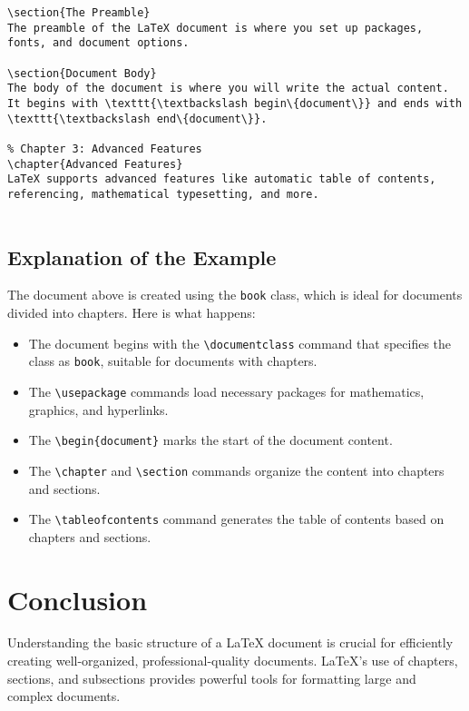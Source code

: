\begin{verbatim}
\section{The Preamble}
The preamble of the LaTeX document is where you set up packages, fonts, and document options.

\section{Document Body}
The body of the document is where you will write the actual content. It begins with \texttt{\textbackslash begin\{document\}} and ends with \texttt{\textbackslash end\{document\}}.

% Chapter 3: Advanced Features
\chapter{Advanced Features}
LaTeX supports advanced features like automatic table of contents, referencing, mathematical typesetting, and more.


\end{verbatim}

\subsection{Explanation of the Example}
The document above is created using the \texttt{book} class, which is ideal for documents divided into chapters. Here is what happens:
\begin{itemize}
    \item The document begins with the \texttt{\textbackslash documentclass} command that specifies the class as \texttt{book}, suitable for documents with chapters.
    \item The \texttt{\textbackslash usepackage} commands load necessary packages for mathematics, graphics, and hyperlinks.
    \item The \texttt{\textbackslash begin\{document\}} marks the start of the document content.
    \item The \texttt{\textbackslash chapter} and \texttt{\textbackslash section} commands organize the content into chapters and sections.
    \item The \texttt{\textbackslash tableofcontents} command generates the table of contents based on chapters and sections.
\end{itemize}

\section{Conclusion}
Understanding the basic structure of a LaTeX document is crucial for efficiently creating well-organized, professional-quality documents. LaTeX's use of chapters, sections, and subsections provides powerful tools for formatting large and complex documents.

